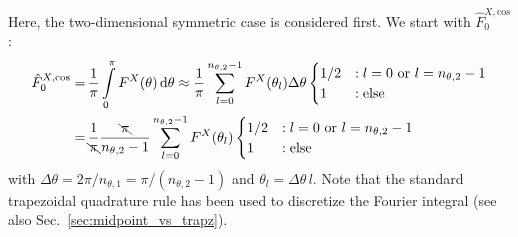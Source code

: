 Here, the two-dimensional symmetric case is considered first.
We start with $\hat{F}^{X,\mathrm{cos}}_0$:
\begin{align}
  \hat{F}^{X,\mathrm{cos}}_0
 =&\, \frac{1}{\pi} \int\limits_0^{\pi} F^{X}(\theta) \,\mathrm{d}\theta
 \approx \frac{1}{\pi} \sum\limits_{l=0}^{n_{\theta,2}-1} F^{X}(\theta_l) \Delta\theta \begin{cases}
                                                                                         1/2 &: l=0 \textrm{ or } l=n_{\theta,2}-1 \\
                                                                                         1   &: \textrm{else}
                                                                                       \end{cases} \nonumber \\
 =&\, \frac{1}{\bcancel{\pi}} \frac{\bcancel{\pi}}{n_{\theta,2}-1} \sum\limits_{l=0}^{n_{\theta,2}-1} F^{X}(\theta_l) \begin{cases}
                                                                                                                        1/2 &: l=0 \textrm{ or } l=n_{\theta,2}-1 \\
                                                                                                                        1   &: \textrm{else}
                                                                                                                      \end{cases}
\end{align}
with $\Delta\theta = 2 \pi / n_{\theta,1} = \pi/(n_{\theta,2}-1)$ and $\theta_l = \Delta\theta \,l$.
Note that the standard trapezoidal quadrature rule has been used to discretize the Fourier integral (see also Sec.~\ref{sec:midpoint_vs_trapz}).

